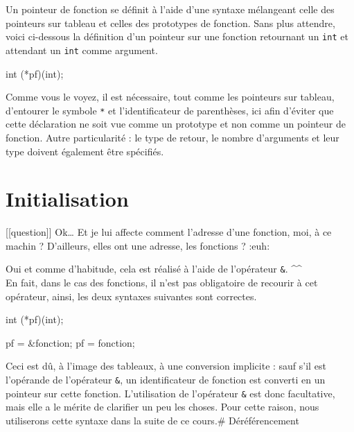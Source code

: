 \documentclass[]{article}
\newenvironment{Shaded}{}{}
\newcommand{\DataTypeTok}[1]{\textcolor[rgb]{0.56,0.13,0.00}{{#1}}}
\newcommand{\NormalTok}[1]{{#1}}
\begin{document}
Un pointeur de fonction se définit à l'aide d'une syntaxe mélangeant
celle des pointeurs sur tableau et celles des prototypes de fonction.
Sans plus attendre, voici ci-dessous la définition d'un pointeur sur une
fonction retournant un \texttt{int} et attendant un \texttt{int} comme
argument.

\begin{Shaded}
\begin{Highlighting}[]
\DataTypeTok{int} \NormalTok{(*pf)(}\DataTypeTok{int}\NormalTok{);}
\end{Highlighting}
\end{Shaded}

Comme vous le voyez, il est nécessaire, tout comme les pointeurs sur
tableau, d'entourer le symbole \texttt{*} et l'identificateur de
parenthèses, ici afin d'éviter que cette déclaration ne soit vue comme
un prototype et non comme un pointeur de fonction. Autre particularité :
le type de retour, le nombre d'arguments et leur type doivent également
être spécifiés.

\section{Initialisation}\label{initialisation}

{[}{[}question{]}{]} \textbar{} Ok\ldots{} Et je lui affecte comment
l'adresse d'une fonction, moi, à ce machin ? D'ailleurs, elles ont une
adresse, les fonctions ? :euh:

Oui et comme d'habitude, cela est réalisé à l'aide de l'opérateur
\texttt{\&}. \^{}\^{}\\
En fait, dans le cas des fonctions, il n'est pas obligatoire de recourir
à cet opérateur, ainsi, les deux syntaxes suivantes sont correctes.

\begin{Shaded}
\begin{Highlighting}[]
\DataTypeTok{int} \NormalTok{(*pf)(}\DataTypeTok{int}\NormalTok{);}

\NormalTok{pf = &fonction;}
\NormalTok{pf = fonction;}
\end{Highlighting}
\end{Shaded}

Ceci est dû, à l'image des tableaux, à une conversion implicite : sauf
s'il est l'opérande de l'opérateur \texttt{\&}, un identificateur de
fonction est converti en un pointeur sur cette fonction. L'utilisation
de l'opérateur \texttt{\&} est donc facultative, mais elle a le mérite
de clarifier un peu les choses. Pour cette raison, nous utiliserons
cette syntaxe dans la suite de ce cours.\# Déréférencement
\end{document}
